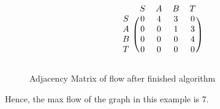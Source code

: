         \begin{figure}[H]
            \centering
            \[
                \begin{blockarray}{ccccc}
                    & S & A & B & T \\
                    \begin{block}{c(cccc)}
                        S & 0 & 4 & 3 & 0 \\
                        A & 0 & 0 & 1 & 3 \\
                        B & 0 & 0 & 0 & 4 \\
                        T & 0 & 0 & 0 & 0 \\
                    \end{block}
                \end{blockarray}
            \]
            \caption{Adjacency Matrix of flow after finished algorithm}
        \end{figure}
        
        Hence, the max flow of the graph in this example is 7.
        
